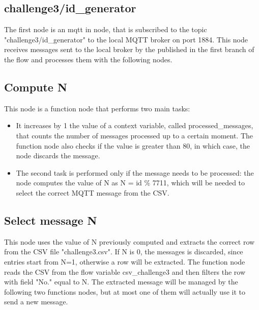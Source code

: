 \subsection{challenge3/id\_generator}
The first node is an mqtt in node, that is subscribed to the topic "challenge3/id\_generator" to the local MQTT broker on port 1884. This node receives messages sent to the local broker by the published in the first branch of the flow and processes them with the following nodes.

\subsection{Compute N}
This node is a function node that performs two main tasks:
\begin{itemize}
\item It increases by 1 the value of a context variable, called processed\_messages, that counts the number of messages processed up to a certain moment. The function node also checks if the value is greater than 80, in which case, the node discards the message.
\item The second task is performed only if the message needs to be processed: the node computes the value of N as N = id \% 7711, which will be needed to select the correct MQTT message from the CSV.
\end{itemize}

\subsection{Select message N}
This node uses the value of N previously computed and extracts the correct row from the CSV file "challenge3.csv". If N is 0, the messages is discarded, since entries start from N=1, otherwise a row will be extracted. The function node reads the CSV from the flow variable csv\_challenge3 and then filters the row with field "No." equal to N. The extracted message will be managed by the following two functions nodes, but at most one of them will actually use it to send a new message.

